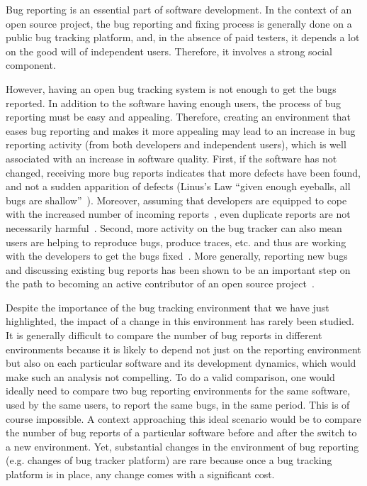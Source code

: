 \documentclass[conference]{IEEEtran}
\begin{document}
Bug reporting is an essential part of software development.
In the context of an open source project, the bug reporting and fixing process is generally done on a public bug tracking platform, and, in the absence of paid testers, it depends a lot on the good will of independent users. Therefore, it involves a strong social component.

However, having an open bug tracking system is not enough to get the bugs reported. In addition to the software having enough users, the process of bug reporting must be easy and appealing. Therefore, creating an environment that eases bug reporting and makes it more appealing may lead to an increase in bug reporting activity (from both developers and independent users), which is well associated with an increase in software quality. First, if the software has not changed, receiving more bug reports indicates that more defects have been found, and not a sudden apparition of defects (Linus's Law ``given enough eyeballs, all bugs are shallow''~\cite{raymond1999cathedral,van2009shallow}). Moreover, assuming that developers are equipped to cope with the increased number of incoming reports~\cite{anvik2005coping, davidson2011coping}, even duplicate reports are not necessarily harmful~\cite{Bettenburg2008}. Second, more activity on the bug tracker can also mean users are helping to reproduce bugs, produce traces, etc. and thus are working with the developers to get the bugs fixed~\cite{breu2010information}. More generally, reporting new bugs and discussing existing bug reports has been shown to be an important step on the path to becoming an active contributor of an open source project~\cite{jensen2007role, nakakoji2002evolution, ye2003toward}.

Despite the importance of the bug tracking environment that we have just highlighted, the impact of a change in this environment has rarely been studied. It is generally difficult to compare the number of bug reports in different environments because it is likely to depend  not just on the reporting environment but also on each particular software and its development dynamics, which would make such an analysis not compelling. To do a valid comparison, one would ideally need to compare two bug reporting environments for the same software, used by the same users, to report the same bugs, in the same period. This is of course impossible. A context approaching this ideal scenario would be to compare the number of bug reports of a particular software before and after the switch to a new environment. Yet, substantial changes in the environment of bug reporting (e.g. changes of bug tracker platform) are rare because once a bug tracking platform is in place, any change comes with a significant cost. 
\end{document}
